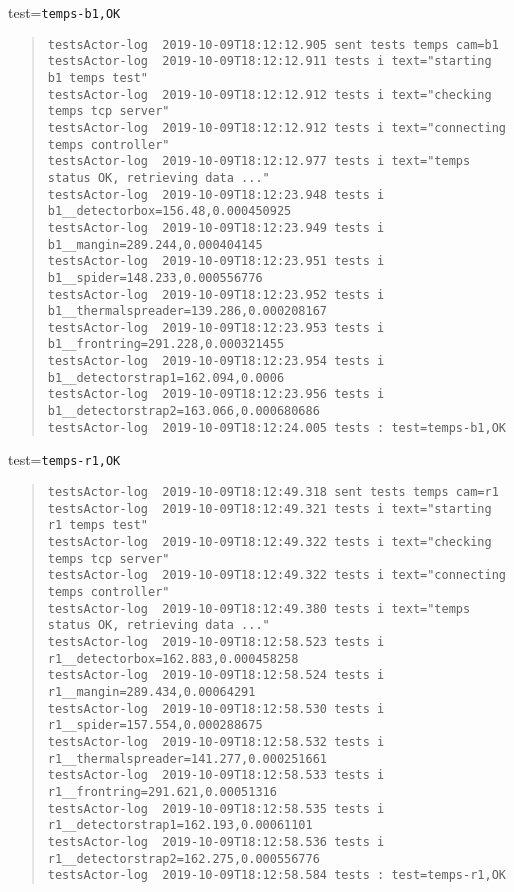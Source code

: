 test=\texttt{temps-b1,OK}

\begin{quote}
\begin{tiny}
\begin{verbatim}
testsActor-log  2019-10-09T18:12:12.905 sent tests temps cam=b1
testsActor-log  2019-10-09T18:12:12.911 tests i text="starting b1 temps test"
testsActor-log  2019-10-09T18:12:12.912 tests i text="checking temps tcp server"
testsActor-log  2019-10-09T18:12:12.912 tests i text="connecting temps controller"
testsActor-log  2019-10-09T18:12:12.977 tests i text="temps status OK, retrieving data ..."
testsActor-log  2019-10-09T18:12:23.948 tests i b1__detectorbox=156.48,0.000450925
testsActor-log  2019-10-09T18:12:23.949 tests i b1__mangin=289.244,0.000404145
testsActor-log  2019-10-09T18:12:23.951 tests i b1__spider=148.233,0.000556776
testsActor-log  2019-10-09T18:12:23.952 tests i b1__thermalspreader=139.286,0.000208167
testsActor-log  2019-10-09T18:12:23.953 tests i b1__frontring=291.228,0.000321455
testsActor-log  2019-10-09T18:12:23.954 tests i b1__detectorstrap1=162.094,0.0006
testsActor-log  2019-10-09T18:12:23.956 tests i b1__detectorstrap2=163.066,0.000680686
testsActor-log  2019-10-09T18:12:24.005 tests : test=temps-b1,OK
\end{verbatim}
\end{tiny}
\end{quote}

\noindent test=\texttt{temps-r1,OK}

\begin{quote}
\begin{tiny}
\begin{verbatim}
testsActor-log  2019-10-09T18:12:49.318 sent tests temps cam=r1
testsActor-log  2019-10-09T18:12:49.321 tests i text="starting r1 temps test"
testsActor-log  2019-10-09T18:12:49.322 tests i text="checking temps tcp server"
testsActor-log  2019-10-09T18:12:49.322 tests i text="connecting temps controller"
testsActor-log  2019-10-09T18:12:49.380 tests i text="temps status OK, retrieving data ..."
testsActor-log  2019-10-09T18:12:58.523 tests i r1__detectorbox=162.883,0.000458258
testsActor-log  2019-10-09T18:12:58.524 tests i r1__mangin=289.434,0.00064291
testsActor-log  2019-10-09T18:12:58.530 tests i r1__spider=157.554,0.000288675
testsActor-log  2019-10-09T18:12:58.532 tests i r1__thermalspreader=141.277,0.000251661
testsActor-log  2019-10-09T18:12:58.533 tests i r1__frontring=291.621,0.00051316
testsActor-log  2019-10-09T18:12:58.535 tests i r1__detectorstrap1=162.193,0.00061101
testsActor-log  2019-10-09T18:12:58.536 tests i r1__detectorstrap2=162.275,0.000556776
testsActor-log  2019-10-09T18:12:58.584 tests : test=temps-r1,OK
\end{verbatim}
\end{tiny}
\end{quote}

